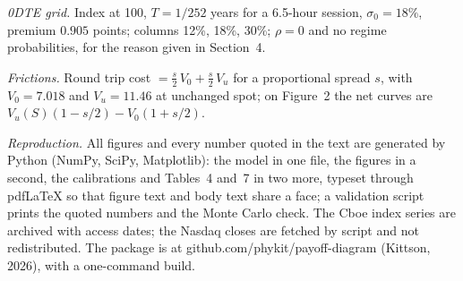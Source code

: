 \documentclass[11pt,a4paper]{article}
\begin{document}
\emph{0DTE grid.} Index at 100, $T = 1/252$ years for a 6.5-hour session, $\sigma_0 = 18\%$, premium $0.905$ points; columns 12\%, 18\%, 30\%; $\rho = 0$ and no regime probabilities, for the reason given in Section~4.

\emph{Frictions.} Round trip cost $= \tfrac{s}{2}\,V_0 + \tfrac{s}{2}\,V_u$ for a proportional spread $s$, with $V_0 = 7.018$ and $V_u = 11.46$ at unchanged spot; on Figure~2 the net curves are $V_u(S)(1-s/2) - V_0(1+s/2)$.

\emph{Reproduction.} All figures and every number quoted in the text are generated by Python (NumPy, SciPy, Matplotlib): the model in one file, the figures in a second, the calibrations and Tables~4 and~7 in two more, typeset through pdfLaTeX so that figure text and body text share a face; a validation script prints the quoted numbers and the Monte Carlo check. The Cboe index series are archived with access dates; the Nasdaq closes are fetched by script and not redistributed. The package is at github.com/phykit/payoff-diagram (Kittson, 2026), with a one-command build.
\end{document}
